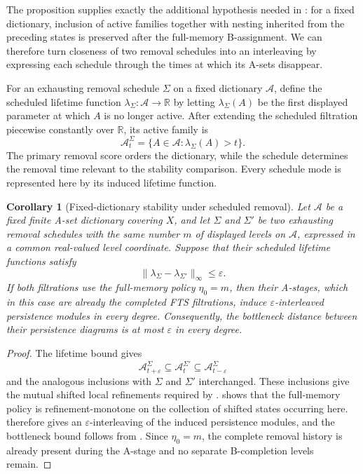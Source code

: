 \documentclass[a4paper,11pt]{article}
\newtheorem{corollary}[corollary]{Corollary}
\theoremstyle{definition}
\theoremstyle{remark}
\begin{document}
The proposition supplies exactly the additional hypothesis needed in : for a fixed dictionary, inclusion of active families together with nesting inherited from the preceding states is preserved after the full-memory B-assignment. We can therefore turn closeness of two removal schedules into an interleaving by expressing each schedule through the times at which its A-sets disappear.

For an exhausting removal schedule $\Sigma$ on a fixed dictionary $\mathcal A$, define the scheduled lifetime function $\lambda_{\Sigma}\colon\mathcal A\longrightarrow\mathbb R$ by letting $\lambda_{\Sigma}(A)$ be the first displayed parameter at which $A$ is no longer active. After extending the scheduled filtration piecewise constantly over $\mathbb R$, its active family is
$$
\mathcal A_t^{\Sigma}=\{A\in\mathcal A\colon\lambda_{\Sigma}(A)>t\}.
$$
The primary removal score orders the dictionary, while the schedule determines the removal time relevant to the stability comparison. Every schedule mode is represented here by its induced lifetime function.

\begin{corollary}[Fixed-dictionary stability under scheduled removal]
\label{cor:fixed-rule-score-stability}
Let $\mathcal A$ be a fixed finite A-set dictionary covering $X$, and let $\Sigma$ and $\Sigma'$ be two exhausting removal schedules with the same number $m$ of displayed levels on $\mathcal A$, expressed in a common real-valued level coordinate. Suppose that their scheduled lifetime functions satisfy
$$
\|\lambda_{\Sigma}-\lambda_{\Sigma'}\|_\infty\leq\varepsilon.
$$
If both filtrations use the full-memory policy $\eta_0=m$, then their A-stages, which in this case are already the completed FTS filtrations, induce $\varepsilon$-interleaved persistence modules in every degree. Consequently, the bottleneck distance between their persistence diagrams is at most $\varepsilon$ in every degree.
\end{corollary}

\begin{proof}
The lifetime bound gives
$$
\mathcal A_{t+\varepsilon}^{\Sigma}
\subseteq
\mathcal A_t^{\Sigma'}
\subseteq
\mathcal A_{t-\varepsilon}^{\Sigma}
$$
and the analogous inclusions with $\Sigma$ and $\Sigma'$ interchanged. These inclusions give the mutual shifted local refinements required by .  shows that the full-memory policy is refinement-monotone on the collection of shifted states occurring here.  therefore gives an $\varepsilon$-interleaving of the induced persistence modules, and the bottleneck bound follows from . Since $\eta_0=m$, the complete removal history is already present during the A-stage and no separate B-completion levels remain.
\end{proof}
\end{document}
